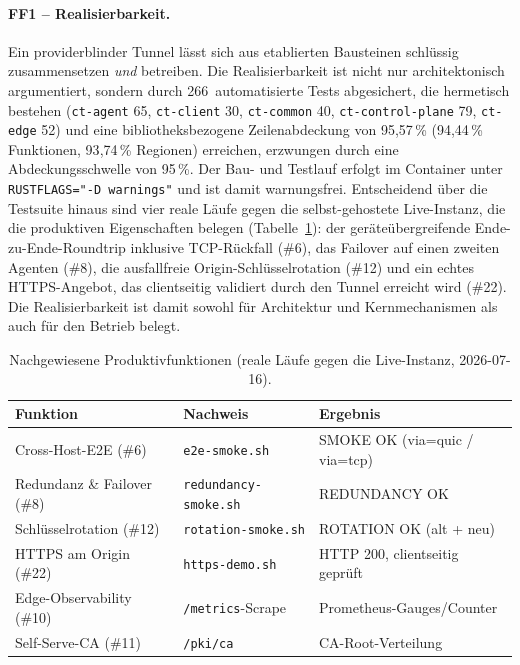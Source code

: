 \paragraph{FF1 -- Realisierbarkeit.} Ein providerblinder Tunnel lässt sich aus
etablierten Bausteinen schlüssig zusammensetzen \emph{und} betreiben. Die
Realisierbarkeit ist nicht nur architektonisch argumentiert, sondern durch
266~automatisierte Tests abgesichert, die hermetisch bestehen (\texttt{ct-agent}
65, \texttt{ct-client} 30, \texttt{ct-common} 40, \texttt{ct-control-plane} 79,
\texttt{ct-edge} 52) und eine bibliotheksbezogene Zeilenabdeckung von
95{,}57\,\% (94{,}44\,\% Funktionen, 93{,}74\,\% Regionen) erreichen, erzwungen
durch eine Abdeckungsschwelle von 95\,\%. Der Bau- und Testlauf erfolgt im
Container unter \texttt{RUSTFLAGS="-D warnings"} und ist damit warnungsfrei.
Entscheidend über die Testsuite hinaus sind vier reale Läufe gegen die
selbst-gehostete Live-Instanz, die die produktiven Eigenschaften belegen
(Tabelle~\ref{tab:fazit-features}): der geräteübergreifende
Ende-zu-Ende-Roundtrip inklusive TCP-Rückfall (\#6), das Failover auf einen
zweiten Agenten (\#8), die ausfallfreie Origin-Schlüsselrotation (\#12) und ein
echtes HTTPS-Angebot, das clientseitig validiert durch den Tunnel erreicht wird
(\#22). Die Realisierbarkeit ist damit sowohl für Architektur und
Kernmechanismen als auch für den Betrieb belegt.

\begin{table}[t]
\centering
\caption{Nachgewiesene Produktivfunktionen (reale Läufe gegen die Live-Instanz,
2026-07-16).}
\label{tab:fazit-features}
\begin{tabular}{lll}
\toprule
Funktion & Nachweis & Ergebnis \\
\midrule
Cross-Host-E2E (\#6)        & \texttt{e2e-smoke.sh}        & SMOKE OK (via=quic / via=tcp) \\
Redundanz \& Failover (\#8) & \texttt{redundancy-smoke.sh} & REDUNDANCY OK \\
Schlüsselrotation (\#12)    & \texttt{rotation-smoke.sh}   & ROTATION OK (alt + neu) \\
HTTPS am Origin (\#22)      & \texttt{https-demo.sh}       & HTTP 200, clientseitig geprüft \\
Edge-Observability (\#10)   & \texttt{/metrics}-Scrape     & Prometheus-Gauges/Counter \\
Self-Serve-CA (\#11)        & \texttt{/pki/ca}             & CA-Root-Verteilung \\
\bottomrule
\end{tabular}
\end{table}

